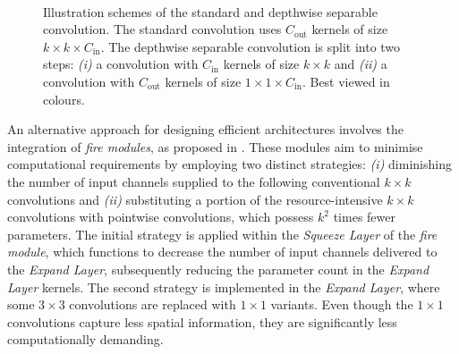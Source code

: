 \begin{figure}[htbp]
\centering
{}\\
    \vspace{1cm}
    \caption{Illustration schemes of the standard and depthwise separable
    convolution. The standard convolution uses $C_\text{out}$ kernels of size
    $k\times k \times C_\text{in}$. The depthwise separable convolution is
    split into two steps: \emph{(i)} a convolution with $C_\text{in}$ kernels
    of size $k \times k$ and \emph{(ii)} a convolution with $C_\text{out}$
    kernels of size $1\times 1 \times C_\text{in}$.
    Best viewed in colours.}
\label{fig:sota:depthwise_conv_vs_standard_conv}
\end{figure}


An alternative approach for designing efficient architectures involves the
integration of \emph{fire modules}, as proposed in
\cite{DBLP:journals/corr/IandolaMAHDK16}. These modules aim to minimise
computational requirements by employing two distinct strategies: \emph{(i)}
diminishing the number of input channels supplied to the following conventional
$k\times k$ convolutions and \emph{(ii)} substituting a portion of the
resource-intensive $k\times k$ convolutions with pointwise convolutions, which
possess $k^2$ times fewer parameters. The initial strategy is applied within the
\emph{Squeeze Layer} of the \emph{fire module}, which functions to decrease the
number of input channels delivered to the \emph{Expand Layer}, subsequently
reducing the parameter count in the \emph{Expand Layer} kernels. The second
strategy is implemented in the \emph{Expand Layer}, where some $3\times3$
convolutions are replaced with $1\times1$ variants. Even though the $1\times1$
convolutions capture less spatial information, they are significantly less
computationally demanding.\\

